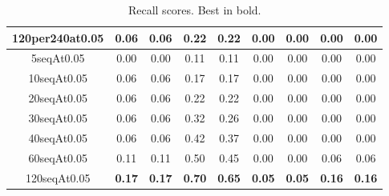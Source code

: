 \documentclass[12pt]{article}
\begin{document}
\begin{table}[]
\begin{tabular}{|c|cc|cc|cc|cc|}
        120per240at0.05 & 0.06                        & 0.06                       & 0.22                        & 0.22                       & 0.00                        & 0.00                       & 0.00                        & 0.00                       \\ \hline
        5seqAt0.05      & 0.00                        & 0.00                       & 0.11                        & 0.11                       & 0.00                        & 0.00                       & 0.00                        & 0.00                       \\
        10seqAt0.05     & 0.06                        & 0.06                       & 0.17                        & 0.17                       & 0.00                        & 0.00                       & 0.00                        & 0.00                       \\
        20seqAt0.05     & 0.06                        & 0.06                       & 0.22                        & 0.22                       & 0.00                        & 0.00                       & 0.00                        & 0.00                       \\
        30seqAt0.05     & 0.06                        & 0.06                       & 0.32                        & 0.26                       & 0.00                        & 0.00                       & 0.00                        & 0.00                       \\
        40seqAt0.05     & 0.06                        & 0.06                       & 0.42                        & 0.37                       & 0.00                        & 0.00                       & 0.00                        & 0.00                       \\
        60seqAt0.05     & 0.11                        & 0.11                       & 0.50                        & 0.45                       & 0.00                        & 0.00                       & 0.06                        & 0.06                       \\
        120seqAt0.05    & \textbf{0.17}               & \textbf{0.17}              & \textbf{0.70}               & \textbf{0.65}              & \textbf{0.05}               & \textbf{0.05}              & \textbf{0.16}               & \textbf{0.16}              \\ \hline
    \end{tabular}
    \caption{Recall scores. Best in bold.}
\end{table}
\end{document}
